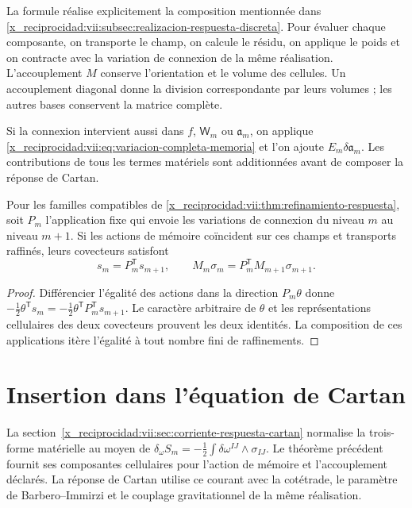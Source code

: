 La formule réalise explicitement la composition mentionnée dans \ref{x_reciprocidad:vii:subsec:realizacion-respuesta-discreta}. Pour évaluer chaque composante, on transporte le champ, on calcule le résidu, on applique le poids et on contracte avec la variation de connexion de la même réalisation. L'accouplement \(M\) conserve l'orientation et le volume des cellules. Un accouplement diagonal donne la division correspondante par leurs volumes ; les autres bases conservent la matrice complète.

Si la connexion intervient aussi dans \(f\), \(\mathsf W_m\)
ou \(\mathfrak a_m\), on applique
\eqref{x_reciprocidad:vii:eq:variacion-completa-memoria} et l'on ajoute
\(E_m\delta\mathfrak a_m\). Les contributions de tous les
termes matériels sont additionnées avant de composer la réponse de Cartan.

\begin{corollary}
\label{x_reciprocidad:vii:cor:refinamiento-corriente-conexion}
Pour les familles compatibles de
\ref{x_reciprocidad:vii:thm:refinamiento-respuesta}, soit \(P_m\) l'application fixe
qui envoie les variations de connexion du niveau \(m\) au niveau
\(m+1\). Si les actions de mémoire coïncident sur ces champs
et transports raffinés, leurs covecteurs satisfont
\[
 s_m=P_m^{\mathsf T}s_{m+1},\qquad
 M_m\sigma_m=P_m^{\mathsf T}M_{m+1}\sigma_{m+1}.
\]
\end{corollary}

\begin{proof}
Différencier l'égalité des actions dans la direction
\(P_m\theta\) donne
\(-\tfrac12\theta^{\mathsf T}s_m
 =-\tfrac12\theta^{\mathsf T}P_m^{\mathsf T}s_{m+1}\).
Le caractère arbitraire de \(\theta\) et les représentations cellulaires
des deux covecteurs prouvent les deux identités. La composition de
ces applications itère l'égalité à tout nombre fini de raffinements.
\end{proof}

\section{Insertion dans l'équation de Cartan}

La section~\ref{x_reciprocidad:vii:sec:corriente-respuesta-cartan} normalise la trois-forme matérielle au moyen de \(\delta_\omega S_m=-\tfrac12\int\delta\omega^{IJ}\wedge
\sigma_{IJ}\). Le théorème précédent fournit ses composantes cellulaires pour l'action de mémoire et l'accouplement déclarés. La réponse de Cartan utilise ce courant avec la cotétrade, le paramètre de Barbero--Immirzi et le couplage gravitationnel de la même réalisation.

